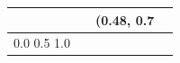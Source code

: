\begin{tabular}{llll}
\toprule
 &  & (0.48, 0.7 &  \\
\midrule
0.0 0.5 1.0 &  &  &  \\
\bottomrule
\end{tabular}
